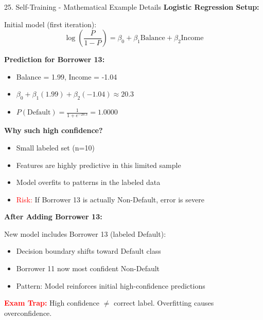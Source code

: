 \documentclass[8pt]{beamer}
\begin{document}
	\begin{frame}{25. Self-Training - Mathematical Example Details}
		\fontsize{6.5}{7.5}\selectfont
		\textbf{Logistic Regression Setup:}
		
		Initial model (first iteration):
		\[
		\log\left(\frac{P}{1-P}\right) = \beta_0 + \beta_1 \text{Balance} + \beta_2 \text{Income}
		\]
		
		\textbf{Prediction for Borrower 13:}
		\begin{itemize}
			\item Balance = 1.99, Income = -1.04
			\item $\beta_0 + \beta_1(1.99) + \beta_2(-1.04) \approx 20.3$
			\item $P(\text{Default}) = \frac{1}{1 + e^{-20.3}} = 1.0000$
		\end{itemize}
		
		\textbf{Why such high confidence?}
		\begin{itemize}
			\item Small labeled set (n=10)
			\item Features are highly predictive in this limited sample
			\item Model overfits to patterns in the labeled data
			\item \textcolor{red}{Risk:} If Borrower 13 is actually Non-Default, error is severe
		\end{itemize}
		
		\textbf{After Adding Borrower 13:}
		
		New model includes Borrower 13 (labeled Default):
		\begin{itemize}
			\item Decision boundary shifts toward Default class
			\item Borrower 11 now most confident Non-Default
			\item Pattern: Model reinforces initial high-confidence predictions
		\end{itemize}
		
		\textcolor{red}{\textbf{Exam Trap:}} High confidence $\neq$ correct label. Overfitting causes overconfidence.
	\end{frame}
	
	
\end{document}
